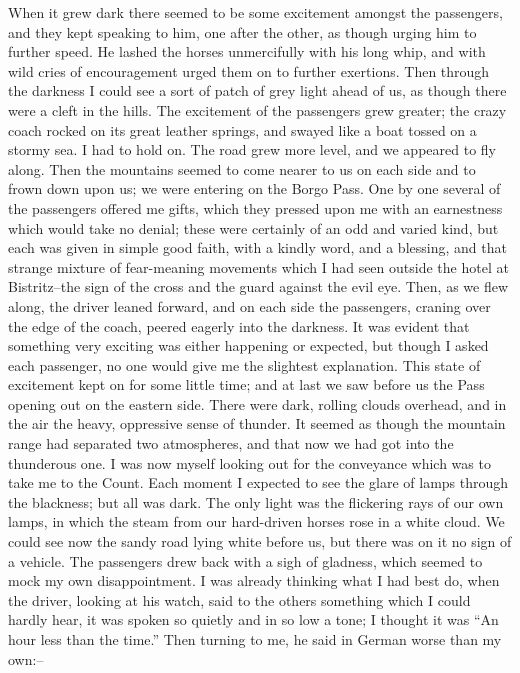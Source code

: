 \documentclass[12pt,openright]{book}
\begin{document}
When it grew dark there seemed to be some excitement amongst the passengers, and they kept speaking to him, one after the other, as though urging him to further speed. He lashed the horses unmercifully with his long whip, and with wild cries of encouragement urged them on to further exertions. Then through the darkness I could see a sort of patch of grey light ahead of us, as though there were a cleft in the hills. The excitement of the passengers grew greater; the crazy coach rocked on its great leather springs, and swayed like a boat tossed on a stormy sea. I had to hold on. The road grew more level, and we appeared to fly along. Then the mountains seemed to come nearer to us on each side and to frown down upon us; we were entering on the Borgo Pass. One by one several of the passengers offered me gifts, which they pressed upon me with an earnestness which would take no denial; these were certainly of an odd and varied kind, but each was given in simple good faith, with a kindly word, and a blessing, and that strange mixture of fear-meaning movements which I had seen outside the hotel at Bistritz–the sign of the cross and the guard against the evil eye. Then, as we flew along, the driver leaned forward, and on each side the passengers, craning over the edge of the coach, peered eagerly into the darkness. It was evident that something very exciting was either happening or expected, but though I asked each passenger, no one would give me the slightest explanation. This state of excitement kept on for some little time; and at last we saw before us the Pass opening out on the eastern side. There were dark, rolling clouds overhead, and in the air the heavy, oppressive sense of thunder. It seemed as though the mountain range had separated two atmospheres, and that now we had got into the thunderous one. I was now myself looking out for the conveyance which was to take me to the Count. Each moment I expected to see the glare of lamps through the blackness; but all was dark. The only light was the flickering rays of our own lamps, in which the steam from our hard-driven horses rose in a white cloud. We could see now the sandy road lying white before us, but there was on it no sign of a vehicle. The passengers drew back with a sigh of gladness, which seemed to mock my own disappointment. I was already thinking what I had best do, when the driver, looking at his watch, said to the others something which I could hardly hear, it was spoken so quietly and in so low a tone; I thought it was “An hour less than the time.” Then turning to me, he said in German worse than my own:–
\end{document}
